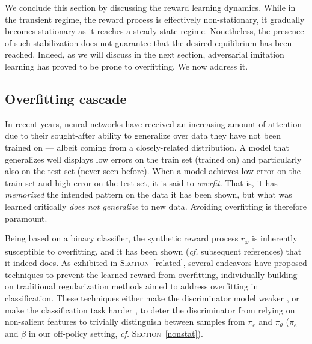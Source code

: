 We conclude this section by  discussing the reward learning dynamics.
While in the transient regime, the reward process is effectively non-stationary,
it gradually becomes stationary
as it reaches a steady-state regime.
Nonetheless, the presence of such stabilization does not guarantee that the desired
equilibrium has been reached.
Indeed, as we will discuss in the next section,
adversarial imitation learning has proved to be prone to overfitting.
We now address it.

\subsection{Overfitting cascade}
\label{overfitting}

In recent years, neural networks have received an increasing amount of attention
due to their sought-after ability to generalize over data they have not been trained on
--- albeit coming from a closely-related distribution.
A model that generalizes well displays low errors on the train set (trained on)
and particularly also on the test set (never seen before).
When a model achieves low error on the train set and high error on the test set, it is said to \emph{overfit}.
That is, it has \emph{memorized} the intended pattern on the data it has been shown,
but what was learned critically \emph{does not generalize} to new data. Avoiding overfitting is therefore paramount.

Being based on a binary classifier, the synthetic reward process $r_\varphi$ is
inherently susceptible to overfitting, and it has been shown (\textit{cf.} subsequent references)
that it indeed does.
As exhibited in \textsc{Section}~\ref{related},
several endeavors have proposed techniques to prevent the learned reward from overfitting,
individually building on traditional regularization methods aimed to address overfitting
in classification.
These techniques either make the discriminator model weaker
\cite{Reed2018-ga,Blonde2019-vc,Kostrikov2019-jo,Peng2018-mo},
or make the classification task harder
\cite{Blonde2019-vc,Xu2019-uo,Zolna2019-wj},
to deter the discriminator from relying on non-salient features
to trivially distinguish between samples from $\pi_e$ and $\pi_\theta$
($\pi_e$ and $\beta$ in our off-policy setting, \textit{cf.} \textsc{Section}~\ref{nonstat}).

